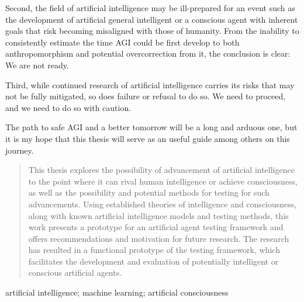 \documentclass[masterthesis]{fer}
\begin{document}
Second, the field of artificial intelligence may be ill-prepared for an event such as the development of artificial general intelligent or a conscious agent with inherent goals that risk becoming misaligned with those of humanity. From the inability to consistently estimate the time AGI could be first develop to both anthropomorphism and potential overcorrection from it, the conclusion is clear: We are not ready.

Third, while continued research of artificial intelligence carries its risks that may not be fully mitigated, so does failure or refusal to do so. We need to proceed, and we need to do so with caution.

The path to safe AGI and a better tomorrow will be a long and arduous one, but it is my hope that this thesis will serve as an useful guide among others on this journey.







\begin{abstract}
  This thesis explores the possibility of advancement of artificial intelligence to the point where it can rival human intelligence or achieve consciousness, as well as the possibility and potential methods for testing for such advancements.
Using established theories of intelligence and consciousness, along with known artificial intelligence models and testing methods, this work presents a prototype for an artificial agent testing framework and offers recommendations and motivation for future research.
The research has resulted in a functional prototype of the testing framework, which facilitates the development and evaluation of potentially intelligent or conscious artificial agents.

\end{abstract}

\begin{keywords}
  artificial intelligence; machine learning; artificial consciousness
\end{keywords}
\end{document}
